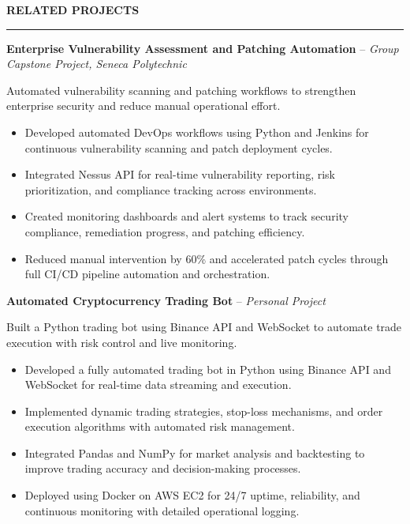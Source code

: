 \documentclass[10pt,letterpaper]{article}
\begin{document}
\vspace{6pt}

\textbf{RELATED PROJECTS}\\[-8pt]
\noindent\rule{\textwidth}{1pt}

\vspace{-2pt}

\textbf{Enterprise Vulnerability Assessment and Patching Automation} -- \emph{Group Capstone Project, Seneca Polytechnic}

\vspace{-1pt}

Automated vulnerability scanning and patching workflows to strengthen enterprise security and reduce manual operational effort.
\vspace{-1pt}
\begin{itemize}
\item Developed automated DevOps workflows using Python and Jenkins for continuous vulnerability scanning and patch deployment cycles.
\item Integrated Nessus API for real-time vulnerability reporting, risk prioritization, and compliance tracking across environments.
\item Created monitoring dashboards and alert systems to track security compliance, remediation progress, and patching efficiency.
\item Reduced manual intervention by 60\% and accelerated patch cycles through full CI/CD pipeline automation and orchestration.
\end{itemize}

\textbf{Automated Cryptocurrency Trading Bot} -- \emph{Personal Project}

\vspace{-1pt}

Built a Python trading bot using Binance API and WebSocket to automate trade execution with risk control and live monitoring.
\vspace{-1pt}
\begin{itemize}
\item Developed a fully automated trading bot in Python using Binance API and WebSocket for real-time data streaming and execution.
\item Implemented dynamic trading strategies, stop-loss mechanisms, and order execution algorithms with automated risk management.
\item Integrated Pandas and NumPy for market analysis and backtesting to improve trading accuracy and decision-making processes.
\item Deployed using Docker on AWS EC2 for 24/7 uptime, reliability, and continuous monitoring with detailed operational logging.
\end{itemize}
\end{document}
